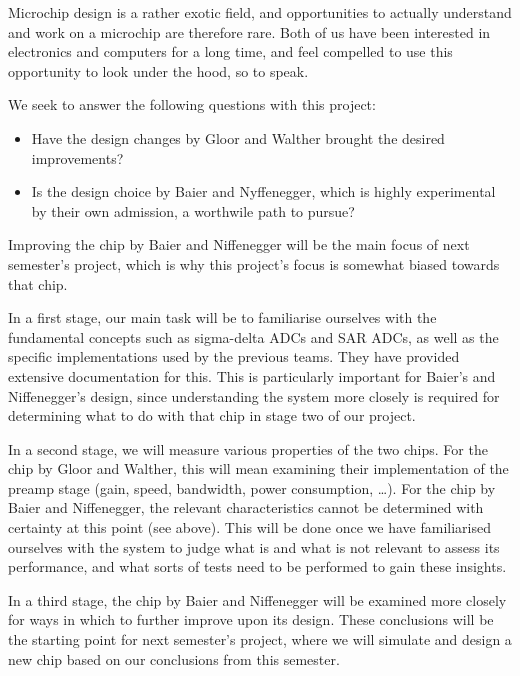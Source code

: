 \documentclass[a4paper,10pt]{article}
\begin{document}
Microchip  design is  a rather  exotic  field, and  opportunities to  actually
understand and  work on a microchip  are therefore rare. Both of  us have been
interested in electronics and computers for a long time, and feel compelled to
use this opportunity to look under the hood, so to speak.

We seek to answer the following questions with this project:

\begin{itemize}
    \item
        Have  the design  changes by  Gloor  and Walther  brought the  desired
        improvements?
    \item
        Is  the  design choice  by  Baier  and  Nyffenegger, which  is  highly
        experimental by their own admission, a worthwile path to pursue?
\end{itemize}

Improving the  chip by Baier  and Niffenegger will be  the main focus  of next
semester's  project, which  is why  this  project's focus  is somewhat  biased
towards that chip.

In a  first stage,  our main task  will be to  familiarise ourselves  with the
fundamental concepts such as sigma-delta ADCs and SAR ADCs, as well as the
specific  implementations  used  by  the previous  teams. They  have  provided
extensive documentation  for this. This is particularly  important for Baier's
and  Niffenegger's design,  since  understanding the  system  more closely  is
required  for determining  what to  do  with that  chip  in stage  two of  our
project.

In a  second stage, we will  measure various properties of  the two chips. For
the chip by  Gloor and Walther, this will mean  examining their implementation
of the preamp  stage (gain, speed, bandwidth,  power consumption, \ldots). For
the  chip by  Baier and  Niffenegger, the  relevant characteristics  cannot be
determined with certainty at this point (see above). This will be done once we
have familiarised ourselves with  the system to judge what is  and what is not
relevant  to assess  its  performance, and  what  sorts of  tests  need to  be
performed to gain these insights.

In  a  third  stage, the  chip  by  Baier  and  Niffenegger will  be  examined
more  closely for  ways in  which to  further improve  upon its  design. These
conclusions will be  the starting point for next semester's  project, where we
will  simulate and  design  a new  chip  based on  our  conclusions from  this
semester.
\end{document}
